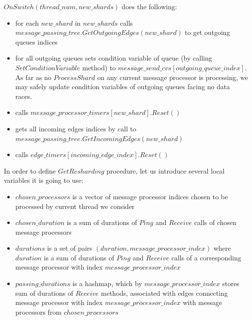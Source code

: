 \documentclass{article}
\begin{document}
$OnSwitch(thread\_num, new\_shards)$ does the following:
\begin{itemize}
	\item for each $new\_shard$ in $new\_shards$ calls \\
		$message\_passing\_tree.GetOutgoingEdges(new\_shard)$ to get outgoing queues indices
	\item for all outgoing queues sets condition variable of queue (by calling $SetConditionVariable$ method) to $message\_send\_cvs[outgoing\_queue\_index]$. As far as no $ProcessShard$ on any current message processor is processing, we may safely update condition variables of outgoing queues facing no data races.
	\item calls $message\_processor\_timers[new\_shard].Reset()$
	\item gets all incoming edges indices by call to \\
		$message\_passing\_tree.GetIncomingEdges(new\_shard)$
	\item calls  $edge\_timers[incoming\_edge\_index].Reset()$
\end{itemize}

In order to define $GetResharding$ procedure, let us introduce several local variables it is going to use:
\begin{itemize}
	\item $chosen\_processors$ is a vector of message processor indices chosen to be processed by current thread we consider
	\item $chosen\_duration$ is a sum of durations of $Ping$ and $Receive$ calls of chosen message processors
	\item $durations$ is a set of pairs $(duration, message\_processor\_index)$ where $duration$ is a sum of durations of $Ping$ and $Receive$ calls of a corresponding message processor with index $message\_processor\_index$
	\item $passing\_durations$ is a hashmap, which by $message\_processor\_index$ stores sum of durations of $Receive$ methods, associated with edges connecting message processor with index $message\_processor\_index$ with message processors from $chosen\_processors$
\end{itemize}
\end{document}
